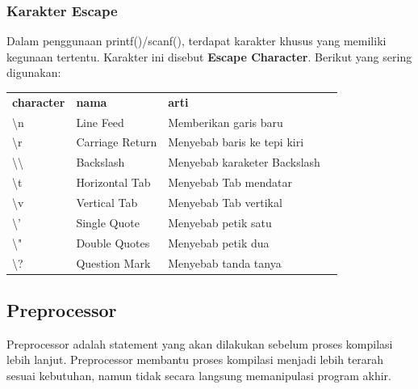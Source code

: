 \documentclass[12pt,]{article}
\begin{document}
	\subsubsection{Karakter Escape}
	Dalam penggunaan printf()/scanf(), terdapat karakter khusus yang memiliki kegunaan tertentu.
	Karakter ini disebut \textbf{Escape Character}.
	Berikut yang sering digunakan:
	\begin{table}[H]
		\begin{tabular}{|l|l|l|l}
			\cline{1-3}
			\textbf{character} & \textbf{nama} & \textbf{arti} \\ \cline{1-3}
			\textbackslash n          & Line Feed	   & Memberikan garis baru        \\ \cline{1-3}
			\textbackslash r          & Carriage Return & Menyebab baris ke tepi kiri  \\ \cline{1-3}
			\textbackslash \textbackslash & Backslash       & Menyebab karaketer Backslash \\ \cline{1-3}
			\textbackslash t          & Horizontal Tab  & Menyebab Tab mendatar        \\ \cline{1-3}
			\textbackslash v          & Vertical Tab    & Menyebab Tab vertikal        \\ \cline{1-3}
			\textbackslash '          & Single Quote    & Menyebab petik satu          \\ \cline{1-3}
			\textbackslash "          & Double Quotes   & Menyebab petik dua           \\ \cline{1-3}
			\textbackslash ?          & Question Mark   & Menyebab tanda tanya         \\ \cline{1-3}
		\end{tabular}
	\end{table}

	\newpage
	\subsection{Preprocessor}

	Preprocessor adalah statement yang akan dilakukan sebelum proses kompilasi lebih lanjut.
	Preprocessor membantu proses kompilasi menjadi lebih terarah sesuai kebutuhan, namun tidak secara langsung memanipulasi program akhir.
\end{document}

